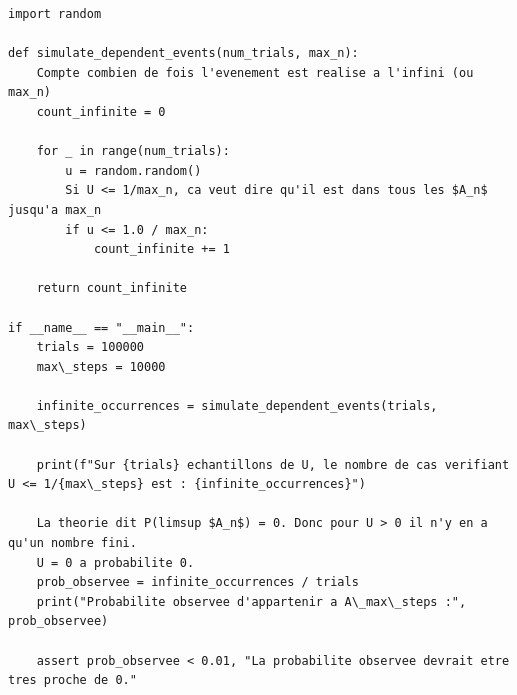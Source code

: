 \documentclass[11pt,a4paper]{article}
\begin{document}
\begin{lstlisting}
import random

def simulate_dependent_events(num_trials, max_n):
    Compte combien de fois l'evenement est realise a l'infini (ou max_n)
    count_infinite = 0

    for _ in range(num_trials):
        u = random.random()
        Si U <= 1/max_n, ca veut dire qu'il est dans tous les $A_n$ jusqu'a max_n
        if u <= 1.0 / max_n:
            count_infinite += 1

    return count_infinite

if __name__ == "__main__":
    trials = 100000
    max\_steps = 10000

    infinite_occurrences = simulate_dependent_events(trials, max\_steps)

    print(f"Sur {trials} echantillons de U, le nombre de cas verifiant U <= 1/{max\_steps} est : {infinite_occurrences}")

    La theorie dit P(limsup $A_n$) = 0. Donc pour U > 0 il n'y en a qu'un nombre fini.
    U = 0 a probabilite 0.
    prob_observee = infinite_occurrences / trials
    print("Probabilite observee d'appartenir a A\_max\_steps :", prob_observee)

    assert prob_observee < 0.01, "La probabilite observee devrait etre tres proche de 0."
\end{lstlisting}
\end{document}
